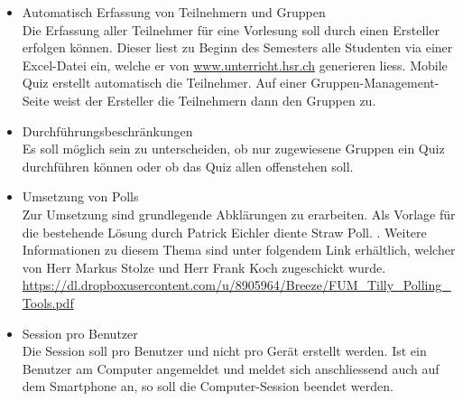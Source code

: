 \begin{itemize}
\begin{itemize}
		\item Auswertungs-Darstellung \\
		Bei der Auswahl der Quiz-Einstellung \glqq nur richtige Anzeigen\grqq wird in der Auswertung bei den falsch beantworteten Fragen ein \glqq ?\grqq anstatt die korrekte Antwort angezeigt. Dies verstehen die Studenten nicht. Es soll überlegt werden, wie man dies besser darstellen kann.
		
		\item Ergänzung des Auswertungs-Screens\\
		In den Auswertungen für den Ersteller soll nebst den totalen Anzahl Stimmen einer Antwort auch der prozentuale Anteil angegeben sein. So kann direkt abgelesen werden, wie viele der Teilnehmer sich der Antwort enthalten haben, also \glqq keine Antwort\grqq angewählt haben.
	\end{itemize}
	
	\item Automatisch Erfassung von Teilnehmern und Gruppen \\
	Die Erfassung aller Teilnehmer für eine Vorlesung soll durch einen Ersteller erfolgen können. Dieser liest zu Beginn des Semesters alle Studenten via einer Excel-Datei ein, welche er von \url{www.unterricht.hsr.ch} generieren liess. Mobile Quiz erstellt automatisch die Teilnehmer. Auf einer Gruppen-Management-Seite weist der Ersteller die Teilnehmern dann den Gruppen zu.
	
	\item Durchführungsbeschränkungen \\
	Es soll möglich sein zu unterscheiden, ob nur zugewiesene Gruppen ein Quiz durchführen können oder ob das Quiz allen offenstehen soll.
	
	\item Umsetzung von Polls \\
	Zur Umsetzung sind  grundlegende Abklärungen zu erarbeiten.
	Als Vorlage für die bestehende Lösung durch Patrick Eichler diente \glqq Straw Poll\grqq . \cite{straw_poll}. Weitere Informationen zu diesem Thema sind unter folgendem Link erhältlich, welcher von Herr Markus Stolze und Herr Frank Koch zugeschickt wurde. \url{https://dl.dropboxusercontent.com/u/8905964/Breeze/FUM_Tilly_Polling_Tools.pdf}
	
	\item Session pro Benutzer \\
	Die Session soll pro Benutzer und nicht pro Gerät erstellt werden. Ist ein Benutzer am Computer angemeldet und meldet sich anschliessend auch auf dem Smartphone an, so soll die Computer-Session beendet werden.
	

\end{itemize}
